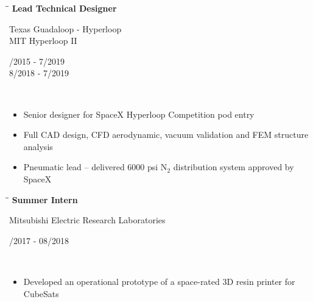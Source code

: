 \documentclass[11pt]{res}
\newcommand{\comment}[1]{}
\begin{document}
\begin{resume}
  \vspace{-18pt}
   \begin{tabbing}
   \hspace{2.3in}\= \hspace{2.7in}\= \kill %
    {\bf Lead Technical Designer} \> \parbox[c]{7.5cm}{ \centering Texas Guadaloop - Hyperloop \\ MIT Hyperloop II} \> \parbox[c]{3.8cm}{ /2015 - 7/2019 \\ 8/2018 - 7/2019}\\
   \end{tabbing}
   \vspace{-22pt}
   	\begin{itemize}
   	\setlength{\leftmargin}{-15pt} \setlength\itemsep{0pt}
	 \item Senior designer for SpaceX Hyperloop Competition pod entry
	 \item Full CAD design, CFD aerodynamic, vacuum validation and FEM structure analysis
	 \item Pneumatic lead {}-- delivered 6000 psi N$_2$ distribution system approved by SpaceX
	\end{itemize} 
	
  \vspace{-18pt}
   \begin{tabbing}
   \hspace{2.3in}\= \hspace{2.7in}\= \kill %
    {\bf Summer Intern} \> \parbox[c]{7.5cm}{ \centering Mitsubishi Electric Research Laboratories}    \> \parbox[c]{3.8cm}{ /2017 - 08/2018} \\
   \end{tabbing}
   \vspace{-22pt}      %
    \begin{itemize}
   	\setlength{\leftmargin}{-15pt} \setlength\itemsep{0pt}
   	\item Developed an operational prototype of a space-rated 3D resin printer for CubeSats
   	\end{itemize}
 
\comment{
   \begin{tabbing}
   \hspace{2.7in}\= \hspace{2.3in}\= \kill %
    {\bf Visiting Research Assistant} \> \parbox[c]{6cm}{ \centering The University of Edinburgh}    \> \parbox[c]{3.8cm}{ \raggedleft 06/2013 - 12/2013} \\
   \end{tabbing}\vspace{-30pt}      %
	Continuation of Master's Thesis work, which included CAD, thermal modeling and FEM simulations. Provided insight into cryoengineering, applications of superconductors, thermal management and CAE under the supervision by Dr. Markus Mueller.
 \vspace{-9pt}

}
\end{resume}
\end{document}
